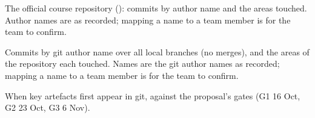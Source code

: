 \begin{table}[ht]\centering\caption{The official course repository (): commits by author name and the areas touched. Author names are as recorded; mapping a name to a team member is for the team to confirm.}\label{tab:course}

\end{table}
\begin{table}[ht]\centering\caption{Commits by git author name over all local branches (no merges), and the areas of the repository each touched. Names are the git author names as recorded; mapping a name to a team member is for the team to confirm.}\label{tab:git}

\end{table}
\begin{table}[ht]\centering\caption{When key artefacts first appear in git, against the proposal's gates (G1 16 Oct, G2 23 Oct, G3 6 Nov).}\label{tab:milestones}

\end{table}
